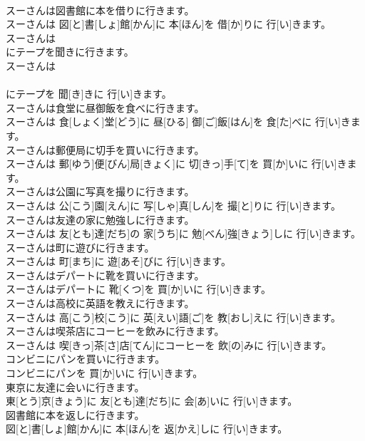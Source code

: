 \documentclass[8pt]{extreport}
\begin{document}
\begin{CJK}{UTF8}{min}
\\	スーさんは図書館に本を借りに行きます。	
\\	スーさんは 図[と]書[しょ]館[かん]に 本[ほん]を 借[か]りに 行[い]きます。
\\	スーさんは
\\	にテープを聞きに行きます。	
\\	スーさんは 
\\	[エル]
\\	[エル]にテープを 聞[き]きに 行[い]きます。
\\	スーさんは食堂に昼御飯を食べに行きます。	
\\	スーさんは 食[しょく]堂[どう]に 昼[ひる] 御[ご]飯[はん]を 食[た]べに 行[い]きます。
\\	スーさんは郵便局に切手を買いに行きます。	
\\	スーさんは 郵[ゆう]便[びん]局[きょく]に 切[きっ]手[て]を 買[か]いに 行[い]きます。
\\	スーさんは公園に写真を撮りに行きます。	
\\	スーさんは 公[こう]園[えん]に 写[しゃ]真[しん]を 撮[と]りに 行[い]きます。
\\	スーさんは友達の家に勉強しに行きます。	
\\	スーさんは 友[とも]達[だち]の 家[うち]に 勉[べん]強[きょう]しに 行[い]きます。
\\	スーさんは町に遊びに行きます。	
\\	スーさんは 町[まち]に 遊[あそ]びに 行[い]きます。
\\	スーさんはデパートに靴を買いに行きます。	
\\	スーさんはデパートに 靴[くつ]を 買[か]いに 行[い]きます。
\\	スーさんは高校に英語を教えに行きます。	
\\	スーさんは 高[こう]校[こう]に 英[えい]語[ご]を 教[おし]えに 行[い]きます。
\\	スーさんは喫茶店にコーヒーを飲みに行きます。	
\\	スーさんは 喫[きっ]茶[さ]店[てん]にコーヒーを 飲[の]みに 行[い]きます。
\\	コンビニにパンを買いに行きます。	
\\	コンビニにパンを 買[か]いに 行[い]きます。
\\	東京に友達に会いに行きます。	
\\	東[とう]京[きょう]に 友[とも]達[だち]に 会[あ]いに 行[い]きます。
\\	図書館に本を返しに行きます。	
\\	図[と]書[しょ]館[かん]に 本[ほん]を 返[かえ]しに 行[い]きます。

\end{CJK}
\end{document}
